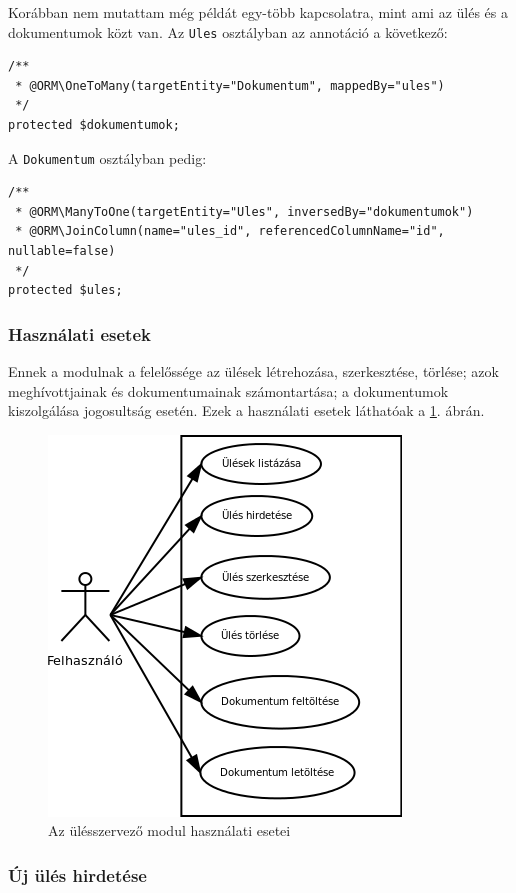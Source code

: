 \documentclass[a4paper,12pt,oneside]{report}
\begin{document}
Korábban nem mutattam még példát egy-több kapcsolatra, mint ami az ülés és a dokumentumok közt van. Az {\tt Ules} osztályban az annotáció a következő:

\begin{lstlisting}
/**
 * @ORM\OneToMany(targetEntity="Dokumentum", mappedBy="ules")
 */
protected $dokumentumok;
\end{lstlisting}

A {\tt Dokumentum} osztályban pedig:

\begin{lstlisting}
/**
 * @ORM\ManyToOne(targetEntity="Ules", inversedBy="dokumentumok")
 * @ORM\JoinColumn(name="ules_id", referencedColumnName="id", nullable=false)
 */
protected $ules;
\end{lstlisting}

\subsubsection*{Használati esetek}

Ennek a modulnak a felelőssége az ülések létrehozása, szerkesztése, törlése; azok meghívottjainak és dokumentumainak számontartása; a dokumentumok kiszolgálása jogosultság esetén. Ezek a használati esetek láthatóak a \ref{fig:ules_usecase}. ábrán.

\begin{figure}[h]
    \centering
    \includegraphics[width=.65\textwidth]{ules_usecase.png}
    \caption{Az ülésszervező modul használati esetei}
    \label{fig:ules_usecase}
\end{figure}

\subsubsection*{Új ülés hirdetése}
\end{document}
